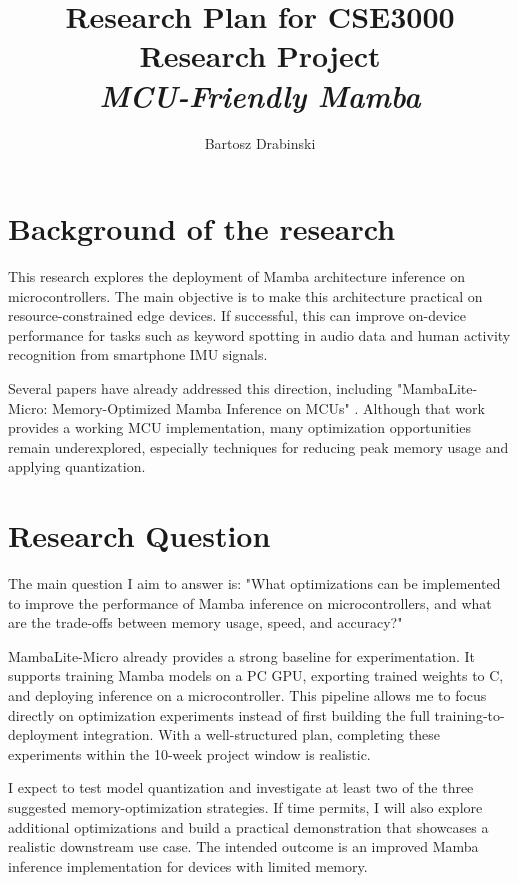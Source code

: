 \documentclass[english, a4paper]{article}
\title{
    Research Plan for CSE3000 Research Project\\
    {\Large \textit{MCU-Friendly Mamba}}
}
\author{Bartosz Drabinski}
\begin{document}
\maketitle


\section*{Background of the research}
This research explores the deployment of Mamba architecture inference \cite{mamba} on microcontrollers. The main objective is to make this architecture practical on resource-constrained edge devices. If successful, this can improve on-device performance for tasks such as keyword spotting in audio data and human activity recognition from smartphone IMU signals.

Several papers have already addressed this direction, including "MambaLite-Micro: Memory-Optimized Mamba Inference on MCUs" \cite{MambaLite-Micro2025}. Although that work provides a working MCU implementation, many optimization opportunities remain underexplored, especially techniques for reducing peak memory usage and applying quantization.

\section*{Research Question}
The main question I aim to answer is: "What optimizations can be implemented to improve the performance of Mamba inference on microcontrollers, and what are the trade-offs between memory usage, speed, and accuracy?"

MambaLite-Micro \cite{MambaLite-Micro2025} already provides a strong baseline for experimentation. It supports training Mamba models on a PC GPU, exporting trained weights to C, and deploying inference on a microcontroller. This pipeline allows me to focus directly on optimization experiments instead of first building the full training-to-deployment integration. With a well-structured plan, completing these experiments within the 10-week project window is realistic.

I expect to test model quantization and investigate at least two of the three suggested memory-optimization strategies. If time permits, I will also explore additional optimizations and build a practical demonstration that showcases a realistic downstream use case. The intended outcome is an improved Mamba inference implementation for devices with limited memory.
\end{document}
